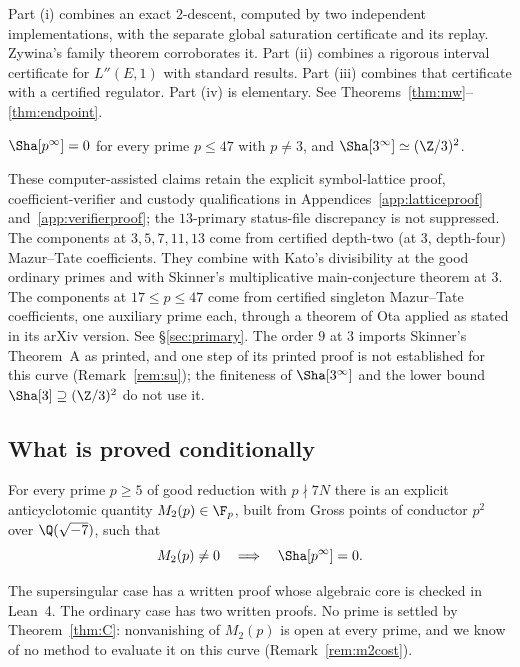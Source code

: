 Part (i) combines an exact $2$-descent, computed by two independent implementations, with the separate global saturation certificate and its replay. Zywina's family theorem \cite{zywina} corroborates it. Part (ii) combines a rigorous interval certificate for $L''(E,1)$ with standard results. Part (iii) combines that certificate with a certified regulator. Part (iv) is elementary. See Theorems~\ref{thm:mw}--\ref{thm:endpoint}.

\begin{theorem}\label{thm:B}
$\Sha[p^\infty]=0$ for every prime $p\le47$ with $p\ne3$, and $\Sha[3^\infty]\simeq(\Z/3)^2$.
\end{theorem}

These computer-assisted claims retain the explicit symbol-lattice proof, coefficient-verifier and custody qualifications in Appendices~\ref{app:latticeproof} and~\ref{app:verifierproof}; the $13$-primary status-file discrepancy is not suppressed. The components at $3,5,7,11,13$ come from certified depth-two (at $3$, depth-four) Mazur--Tate coefficients. They combine with Kato's divisibility at the good ordinary primes and with Skinner's multiplicative main-conjecture theorem at $3$. The components at $17\le p\le47$ come from certified singleton Mazur--Tate coefficients, one auxiliary prime each, through a theorem of Ota \cite{ota} applied as stated in its arXiv version. See \S\ref{sec:primary}. The order $9$ at $3$ imports Skinner's Theorem~A as printed, and one step of its printed proof is not established for this curve (Remark~\ref{rem:su}); the finiteness of $\Sha[3^\infty]$ and the lower bound $\Sha[3]\supseteq(\Z/3)^2$ do not use it.

\subsection{What is proved conditionally}
\begin{theorem}\label{thm:C}
For every prime $p\ge5$ of good reduction with $p\nmid 7N$ there is an explicit anticyclotomic quantity $M_2(p)\in\F_p$, built from Gross points of conductor $p^2$ over $\Q(\sqrt{-7})$, such that
\[
M_2(p)\neq0\quad\Longrightarrow\quad \Sha[p^\infty]=0 .
\]
\end{theorem}
The supersingular case has a written proof whose algebraic core is checked in Lean~4. The ordinary case has two written proofs. No prime is settled by Theorem~\ref{thm:C}: nonvanishing of $M_2(p)$ is open at every prime, and we know of no method to evaluate it on this curve (Remark~\ref{rem:m2cost}).

